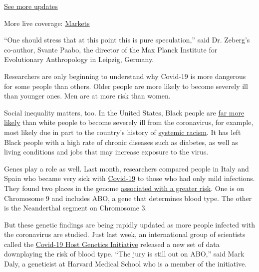 \href{https://www.nytimes3xbfgragh.onion/2020/09/04/world/covid-19-coronavirus.html?action=click\&pgtype=Article\&state=default\&region=MAIN_CONTENT_1\&context=storylines_live_updates}{See
more updates}

More live coverage:
\href{https://www.nytimes3xbfgragh.onion/live/2020/09/04/business/stock-market-today-coronavirus?action=click\&pgtype=Article\&state=default\&region=MAIN_CONTENT_1\&context=storylines_live_updates}{Markets}

``One should stress that at this point this is pure speculation,'' said
Dr. Zeberg's co-author, Svante Paabo, the director of the Max Planck
Institute for Evolutionary Anthropology in Leipzig, Germany.

Researchers are only beginning to understand why Covid-19 is more
dangerous for some people than others. Older people are more likely to
become severely ill than younger ones. Men are at more risk than women.

Social inequality matters, too. In the United States, Black people are
\href{https://www.cdc.gov/coronavirus/2019-ncov/need-extra-precautions/racial-ethnic-minorities.html}{far
more likely} than white people to become severely ill from the
coronavirus, for example, most likely due in part to the country's
history of
\href{https://www.nytimes3xbfgragh.onion/2020/04/29/magazine/racial-disparities-covid-19.html}{systemic
racism}. It has left Black people with a high rate of chronic diseases
such as diabetes, as well as living conditions and jobs that may
increase exposure to the virus.

Genes play a role as well. Last month, researchers compared people in
Italy and Spain who became very sick with
\href{https://www.nytimes3xbfgragh.onion/2020/07/08/health/coronavirus-risk-factors.html}{Covid-19}
to those who had only mild infections. They found two places in the
genome
\href{https://www.nytimes3xbfgragh.onion/2020/06/03/health/coronavirus-blood-type-genetics.html}{associated
with a greater risk}. One is on Chromosome 9 and includes ABO, a gene
that determines blood type. The other is the Neanderthal segment on
Chromosome 3.

But these genetic findings are being rapidly updated as more people
infected with the coronavirus are studied. Just last week, an
international group of scientists called the
\href{https://www.covid19hg.org/}{Covid-19 Host Genetics Initiative}
released a new set of data downplaying the risk of blood type. ``The
jury is still out on ABO,'' said Mark Daly, a geneticist at Harvard
Medical School who is a member of the initiative.

